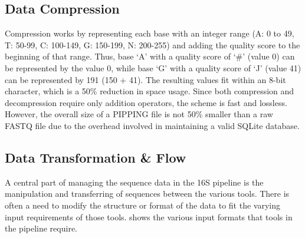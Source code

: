 \documentclass[12pt]{article}
\begin{document}

	\subsection{Data Compression} %
	\label{sub:data_compression}
	Compression works by representing
	each base with an integer range (A: 0 to 49, T: 50-99, C: 100-149, G: 150-199, N: 200-255)
	and adding the quality score to the beginning of that range. Thus, base `A' with a 
	quality score of `\#' (value 0) can be represented by the value 0, while base `G' with
	a quality score of `J' (value 41) can be represented by 191 (150 + 41). The resulting
	values fit within an 8-bit character, which is a 50\% reduction in space usage. 
	Since both compression and decompression require only addition operators, the scheme
	is fast and lossless. However, the overall size of a PIPPING file is not 50\% smaller 
	than a raw FASTQ file due to the overhead involved in maintaining a valid SQLite 
	database.

	
	\subsection{Data Transformation \& Flow} %
	\label{sec:data_transformation}
	A central part of managing the sequence data in the 16S pipeline is the manipulation
	and transferring of sequences between the various tools. There is often a need
	to modify the structure or format of the data to fit the varying input requirements
	of those tools.  shows the various input formats that
	tools in the pipeline require.
\end{document}
